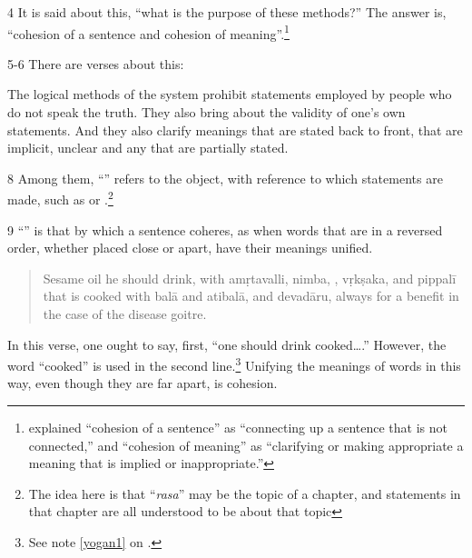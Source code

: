 \begin{translation}
\item [4] It is said about this, “what is the purpose of these methods?”
The answer is, “cohesion of a sentence and cohesion of
meaning”.\footnote{ explained “cohesion of a
    sentence” as “connecting up a sentence that is not connected,” and
    “cohesion of meaning” as “clarifying  or making appropriate a meaning
    that is implied or inappropriate.”}

\item [5-6] There are  verses about this:
  
\begin{sloka}
The logical methods of the system prohibit
statements employed by people who do not speak the truth.
They also bring about the validity of one’s own
statements.  And they also clarify meanings that are stated back to
front, that are implicit, unclear and any that are partially stated.
\end{sloka}

\item [8] Among them, “” refers to the object, with 
reference to which statements are made, such as  or 
.\footnote{The idea here is that “\emph{rasa}” may be the 
topic of a chapter, and statements in that chapter are all understood to be about 
that topic}

\item [9]\label{yoga} “” is that by which a sentence
coheres, as when words that are in a reversed order, whether placed close
or apart, have their meanings unified.
\begin{quote}
    Sesame oil he should drink, with 
\gls{amṛtavalli}, 
\gls{nimba},
,
\gls{vṛkṣaka}, and
\gls{pippalī}
\\[2ex]
that is cooked with 
\gls{balā} and \gls{atibalā}, %
and
\gls{devadāru},
always for a benefit in the case of the disease goitre.
\end{quote}
In this verse, one ought to say, first, “one should drink
cooked\ldots.” However, the word “cooked” is used in the second
line.\footnote{See note \ref{yogan1} on \pageref{yogan1}.} 
Unifying the meanings of words in
    this way, even though they are far apart, is cohesion. 
 


\end{translation}
